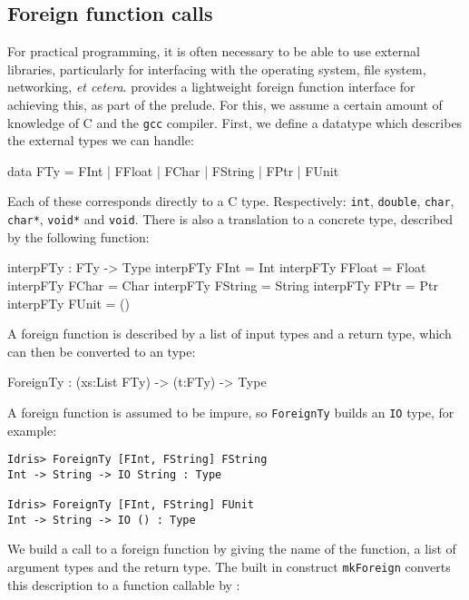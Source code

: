 \subsection{Foreign function calls}

For practical programming, it is often necessary to be able to use external libraries, particularly for interfacing with the operating system, file system, networking, \emph{et cetera}.
\Idris{} provides a lightweight foreign function interface for achieving this, as part of the prelude.
For this, we assume a certain amount of knowledge of C and the \texttt{gcc} compiler.
First, we define a datatype which describes the external types we can handle:

\begin{code}
data FTy = FInt | FFloat | FChar | FString | FPtr | FUnit
\end{code}

\noindent
Each of these corresponds directly to a C type.
Respectively: \texttt{int}, \texttt{double}, \texttt{char}, \texttt{char*}, \texttt{void*} and \texttt{void}.
There is also a translation to a concrete \Idris{} type, described by the following function:

\begin{code}
interpFTy : FTy -> Type
interpFTy FInt    = Int
interpFTy FFloat  = Float
interpFTy FChar   = Char
interpFTy FString = String
interpFTy FPtr    = Ptr
interpFTy FUnit   = ()
\end{code}

\noindent
A foreign function is described by a list of input types and a return type, which can then be converted to an \Idris{} type:

\begin{code}
ForeignTy : (xs:List FTy) -> (t:FTy) -> Type
\end{code}

\noindent
A foreign function is assumed to be impure, so \texttt{ForeignTy} builds an \texttt{IO} type, for example:

\begin{lstlisting}[style=stdout]
Idris> ForeignTy [FInt, FString] FString
Int -> String -> IO String : Type

Idris> ForeignTy [FInt, FString] FUnit 
Int -> String -> IO () : Type
\end{lstlisting}

\noindent
We build a call to a foreign function by giving the name of the function, a list of argument types and the return type.
The built in construct \texttt{mkForeign} converts this description to a function callable by \Idris{}:

